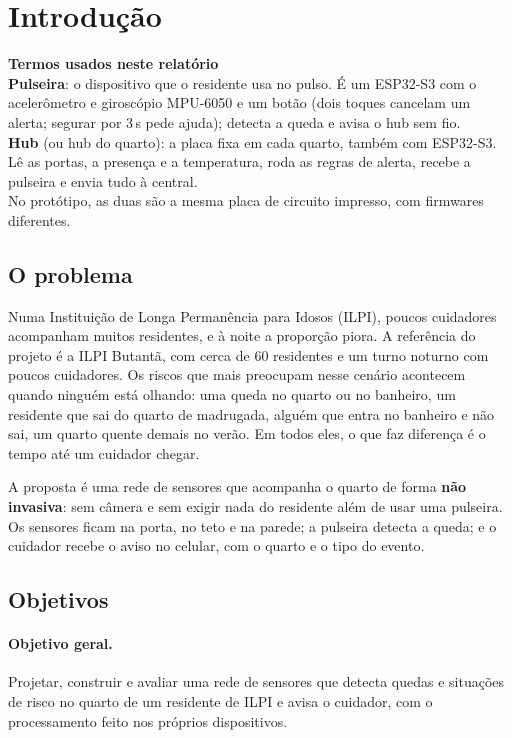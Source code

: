 \section{Introdução}\label{sec:intro}
\noindent\colorbox{lightblue!60}{\parbox{\dimexpr\linewidth-2\fboxsep\relax}{\small
\textbf{\color{uspblue}Termos usados neste relatório}\\[3pt]
\textbf{Pulseira}: o dispositivo que o residente usa no pulso. É um ESP32-S3 com o
acelerômetro e giroscópio MPU-6050 e um botão (dois toques cancelam um alerta; segurar por 3\,s
pede ajuda); detecta a queda e avisa o hub sem fio.\\[2pt]
\textbf{Hub} (ou hub do quarto): a placa fixa em cada quarto, também com ESP32-S3. Lê as
portas, a presença e a temperatura, roda as regras de alerta, recebe a pulseira e envia tudo
à central.\\[2pt]
No protótipo, as duas são a mesma placa de circuito impresso, com firmwares diferentes.}}

\subsection{O problema}

Numa Instituição de Longa Permanência para Idosos (ILPI), poucos cuidadores acompanham
muitos residentes, e à noite a proporção piora. A referência do projeto é a ILPI Butantã,
com cerca de 60 residentes e um turno noturno com poucos cuidadores. Os riscos que mais
preocupam nesse cenário acontecem quando ninguém está olhando: uma queda no quarto ou no
banheiro, um residente que sai do quarto de madrugada, alguém que entra no banheiro e não
sai, um quarto quente demais no verão. Em todos eles, o que faz diferença é o tempo até um
cuidador chegar.

A proposta é uma rede de sensores que acompanha o quarto de forma \textbf{não invasiva}:
sem câmera e sem exigir nada do residente além de usar uma pulseira. Os sensores ficam na
porta, no teto e na parede; a pulseira detecta a queda; e o cuidador recebe o aviso no
celular, com o quarto e o tipo do evento.

\subsection{Objetivos}

\paragraph{Objetivo geral.} Projetar, construir e avaliar uma rede de sensores que detecta
quedas e situações de risco no quarto de um residente de ILPI e avisa o cuidador, com o
processamento feito nos próprios dispositivos.

